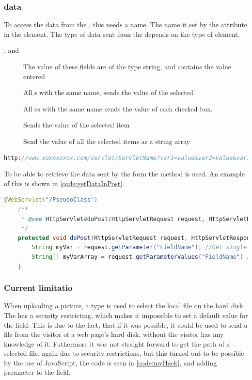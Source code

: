 \subsubsection{ data}
To access the data from the , this needs a name. The name it set by the  attribute in the  element. The type of data sent from the  depends on the type of element.
\begin{description}
	\item[, and ] The value of these fields are of the type string, and contains the value entered
	\item[] All s with the same name, sends the value of the selected 
	\item[] All es with the same name sends the value of each checked box.
	\item[] Sends the value of the selected item
	\item[] Send the value of all the selected items as a string array
\end{description}

\begin{lstlisting}[language=Java,label=code:URLLINK,caption=URL with visible parameters]
http://www.xoxoxoxox.com/servlet/ServletName?var1=value&var2=value&var3=value
\end{lstlisting}

To be able to retrieve the data sent by the form the  method is used. An example of this is shown in \autoref{code:getDataInPost}.

\begin{lstlisting}[language=Java,label=code:getDataInPost,caption=How to read parameters]
	@WebServlet("/PseudoClass")
	/**
	 * @see HttpServlet#doPost(HttpServletRequest request, HttpServletResponse response)
	 */
	protected void doPost(HttpServletRequest request, HttpServletResponse response) throws ServletException, IOException {
		String myVar = request.getParameter("FieldName"); //Get single Value
		String[] myVarArray = request.getParameterValues("FieldName") //Get string array
	}
\end{lstlisting}

\subsubsection{Current limitatio}
When uploading a picture, a  type is used to select the local file on the hard disk. The  has a security restricting, which makes it impossible to set a default value for the field. This is due to the fact, that if it was possible, it could be used to send a file from the visitor of a web page's hard disk, without the visitor has any knowledge of it\cite{noFile}. Futhermore it was not straight forward to get the path of a selected file, again due to security restrictions, but this turned out to be possible by the use of JavaScript, the code is seen in \autoref{code:myHack}, and adding parameter  to the  field.

